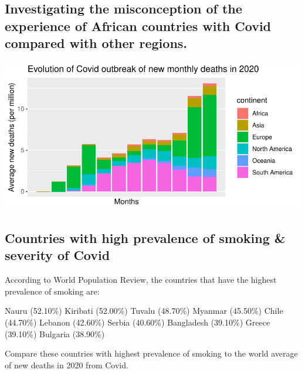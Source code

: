 \documentclass[11pt,preprint, authoryear]{elsarticle}
\let\origfigure\figure
\let\endorigfigure\endfigure
\renewenvironment{figure}[1][2] {
    \expandafter\origfigure\expandafter[H]
} {
    \endorigfigure
}
\numberwithin{equation}{section}
\numberwithin{figure}{section}
\numberwithin{table}{section}
\begin{document}
\hypertarget{investigating-the-misconception-of-the-experience-of-african-countries-with-covid-compared-with-other-regions.}{%
\subsection{Investigating the misconception of the experience of African
countries with Covid compared with other
regions.}\label{investigating-the-misconception-of-the-experience-of-african-countries-with-covid-compared-with-other-regions.}}

\begin{figure}[H]

{\centering \includegraphics{Question1_files/figure-latex/Figure1-1} 

}

\end{figure}

\hypertarget{countries-with-high-prevalence-of-smoking-severity-of-covid}{%
\subsection{Countries with high prevalence of smoking \& severity of
Covid}\label{countries-with-high-prevalence-of-smoking-severity-of-covid}}

According to World Population Review, the countries that have the
highest prevalence of smoking are:

Nauru (52.10\%) Kiribati (52.00\%) Tuvalu (48.70\%) Myanmar (45.50\%)
Chile (44.70\%) Lebanon (42.60\%) Serbia (40.60\%) Bangladesh (39.10\%)
Greece (39.10\%) Bulgaria (38.90\%)

Compare these countries with highest prevalence of smoking to the world
average of new deaths in 2020 from Covid.
\end{document}
